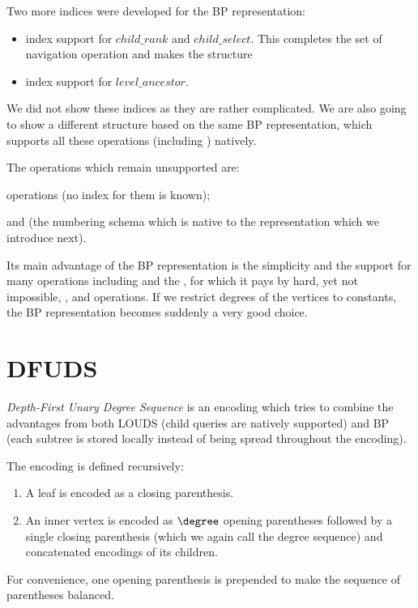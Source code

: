 
Two more indices were developed for the BP representation:
\begin{itemize}
	\item index support for $child\_rank$ and $child\_select$.
	This completes the set of navigation operation and makes the structure 
	\item index support for $level\_ancestor$.
\end{itemize}
We did not show these indices as they are rather complicated.
We are also going to show a different structure based on the same BP representation, which supports all these operations (including \levelAny{}) natively.

The operations which remain unsupported are:
\begin{iteminline}
	\item \levelAny{} operations (no index for them is known);
	\item \dfudsRank{} and \dfudsSelect{} (the numbering schema which is native to the representation which we introduce next).
\end{iteminline}

Its main advantage of the BP representation is the simplicity and the support for many operations including \lca and the \dep, for which it pays by hard, yet not impossible, \childRank, \childSelect and \degree operations.
If we restrict degrees of the vertices to constants, the BP representation becomes suddenly a very good choice.

\section{DFUDS}

\emph{Depth-First Unary Degree Sequence} is an encoding which tries to combine the advantages from both LOUDS (child queries are natively supported) and BP (each subtree is stored locally instead of being spread throughout the encoding).

The encoding is defined recursively:
\begin{enumerate}
	\item A leaf is encoded as a closing parenthesis.
	\item An inner vertex is encoded as $\degree$ opening parentheses followed by a single closing parenthesis (which we again call the degree sequence) and concatenated encodings of its children.
\end{enumerate}
For convenience, one opening parenthesis is prepended to make the sequence of parentheses balanced.

